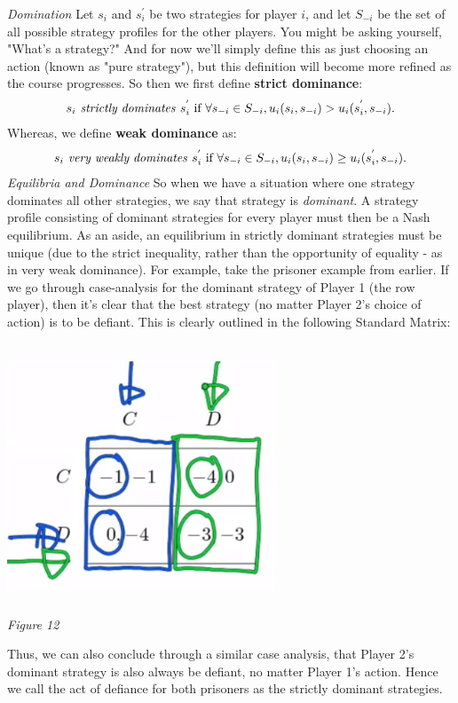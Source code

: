\documentclass{article}
\begin{document}
\emph{Domination}
\vskip 0.1in
Let \(s_{i}\) and \(s_{i}^{'}\) be two strategies for player \(i\), and let \(S_{-i}\) be the set of all possible strategy profiles for the other players. You might be asking yourself, "What's a strategy?" And for now we'll simply define this as just choosing an action (known as "pure strategy"), but this definition will become more refined as the course progresses. So then we first define \textbf{strict dominance}:
\begin{align}
    s_{i} \text{\emph{ strictly dominates }} s_{i}^{'} \text{ if } \forall s_{-i} \in S_{-i}, u_{i}(s_{i}, s_{-i}) > u_{i}(s_{i}^{'}, s_{-i}).
\end{align}
Whereas, we define \textbf{weak dominance} as:
\begin{align}
    s_{i} \text{\emph{ very weakly dominates }} s_{i}^{'} \text{ if } \forall s_{-i} \in S_{-i}, u_{i}(s_{i}, s_{-i}) \geq u_{i}(s_{i}^{'}, s_{-i}).
\end{align}
\vskip 0.1in
\emph{Equilibria and Dominance}
\vskip 0.1in
So when we have a situation where one strategy dominates all other strategies, we say that strategy is \emph{dominant}. A strategy profile consisting of dominant strategies for every player must then be a Nash equilibrium. As an aside, an equilibrium in strictly dominant strategies must be unique (due to the strict inequality, rather than the opportunity of equality - as in very weak dominance).
\vskip 0.05in
For example, take the prisoner example from earlier. If we go through case-analysis for the dominant strategy of Player 1 (the row player), then it's clear that the best strategy (no matter Player 2's choice of action) is to be defiant. This is clearly outlined in the following Standard Matrix:
\begin{center}
    \includegraphics[width = 8cm, height = 8cm]{IMG_012.png} \\
    \emph{Figure 12}
\end{center}
Thus, we can also conclude through a similar case analysis, that Player 2's dominant strategy is also always be defiant, no matter Player 1's action. Hence we call the act of defiance for both prisoners as the strictly dominant strategies. 
\end{document}
